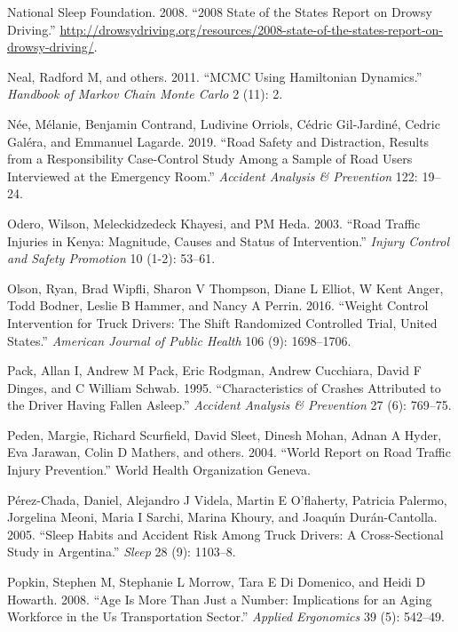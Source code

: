 \documentclass[12pt]{book}
\numberwithin{equation}{chapter}
\begin{document}
\leavevmode\hypertarget{ref-nsleepf}{}%
National Sleep Foundation. 2008. ``2008 State of the States Report on Drowsy Driving.'' \url{http://drowsydriving.org/resources/2008-state-of-the-states-report-on-drowsy-driving/}.

\leavevmode\hypertarget{ref-neal2011mcmc}{}%
Neal, Radford M, and others. 2011. ``MCMC Using Hamiltonian Dynamics.'' \emph{Handbook of Markov Chain Monte Carlo} 2 (11): 2.

\leavevmode\hypertarget{ref-nee2019road}{}%
Née, Mélanie, Benjamin Contrand, Ludivine Orriols, Cédric Gil-Jardiné, Cedric Galéra, and Emmanuel Lagarde. 2019. ``Road Safety and Distraction, Results from a Responsibility Case-Control Study Among a Sample of Road Users Interviewed at the Emergency Room.'' \emph{Accident Analysis \& Prevention} 122: 19--24.

\leavevmode\hypertarget{ref-odero2003road}{}%
Odero, Wilson, Meleckidzedeck Khayesi, and PM Heda. 2003. ``Road Traffic Injuries in Kenya: Magnitude, Causes and Status of Intervention.'' \emph{Injury Control and Safety Promotion} 10 (1-2): 53--61.

\leavevmode\hypertarget{ref-olson2016weight}{}%
Olson, Ryan, Brad Wipfli, Sharon V Thompson, Diane L Elliot, W Kent Anger, Todd Bodner, Leslie B Hammer, and Nancy A Perrin. 2016. ``Weight Control Intervention for Truck Drivers: The Shift Randomized Controlled Trial, United States.'' \emph{American Journal of Public Health} 106 (9): 1698--1706.

\leavevmode\hypertarget{ref-pack1995characteristics}{}%
Pack, Allan I, Andrew M Pack, Eric Rodgman, Andrew Cucchiara, David F Dinges, and C William Schwab. 1995. ``Characteristics of Crashes Attributed to the Driver Having Fallen Asleep.'' \emph{Accident Analysis \& Prevention} 27 (6): 769--75.

\leavevmode\hypertarget{ref-peden2004world}{}%
Peden, Margie, Richard Scurfield, David Sleet, Dinesh Mohan, Adnan A Hyder, Eva Jarawan, Colin D Mathers, and others. 2004. ``World Report on Road Traffic Injury Prevention.'' World Health Organization Geneva.

\leavevmode\hypertarget{ref-perez2005sleep}{}%
Pérez-Chada, Daniel, Alejandro J Videla, Martin E O'flaherty, Patricia Palermo, Jorgelina Meoni, Maria I Sarchi, Marina Khoury, and Joaquı́n Durán-Cantolla. 2005. ``Sleep Habits and Accident Risk Among Truck Drivers: A Cross-Sectional Study in Argentina.'' \emph{Sleep} 28 (9): 1103--8.

\leavevmode\hypertarget{ref-popkin2008age}{}%
Popkin, Stephen M, Stephanie L Morrow, Tara E Di Domenico, and Heidi D Howarth. 2008. ``Age Is More Than Just a Number: Implications for an Aging Workforce in the Us Transportation Sector.'' \emph{Applied Ergonomics} 39 (5): 542--49.
\end{document}
